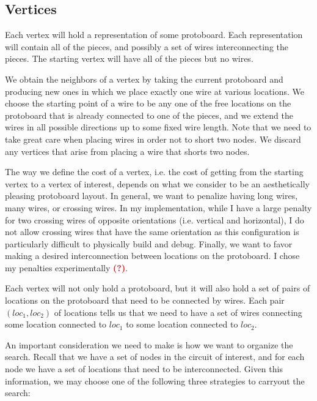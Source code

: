 \subsection{Vertices}

Each vertex will hold a representation of some protoboard. Each representation
will contain all of the pieces, and possibly a set of wires interconnecting the
pieces. The starting vertex will have all of the pieces but no wires.

We obtain the neighbors of a vertex by taking the current protoboard and
producing new ones in which we place exactly one wire at various locations. We
choose the starting point of a wire to be any one of the free locations on the
protoboard that is already connected to one of the pieces, and we extend the
wires in all possible directions up to some fixed wire length. Note that we need
to take great care when placing wires in order not to short two nodes. We
discard any vertices that arise from placing a wire that shorts two nodes.

The way we define the cost of a vertex, i.e. the cost of getting from the
starting vertex to a vertex of interest, depends on what we consider to be an
aesthetically pleasing protoboard layout. In general, we want to penalize having
long wires, many wires, or crossing wires. In my implementation, while I have
a large penalty for two crossing wires of opposite orientations (i.e. vertical
and horizontal), I do not allow crossing wires that have the same orientation as
this configuration is particularly difficult to physically build and debug.
Finally, we want to favor making a desired interconnection between locations
on the protoboard. I chose my penalties experimentally
\textcolor{red}{\textbf{(?)}}.

Each vertex will not only hold a protoboard, but it will also hold a set of
pairs of locations on the protoboard that need to be connected by wires. Each
pair $(loc_1, loc_2)$ of locations tells us that we need to have a set of wires
connecting some location connected to $loc_1$ to some location connected to
$loc_2$.

An important consideration we need to make is how we want to organize the
search. Recall that we have a set of nodes in the circuit of interest, and for
each node we have a set of locations that need to be interconnected. Given this
information, we may choose one of the following three strategies to carryout the
search:


